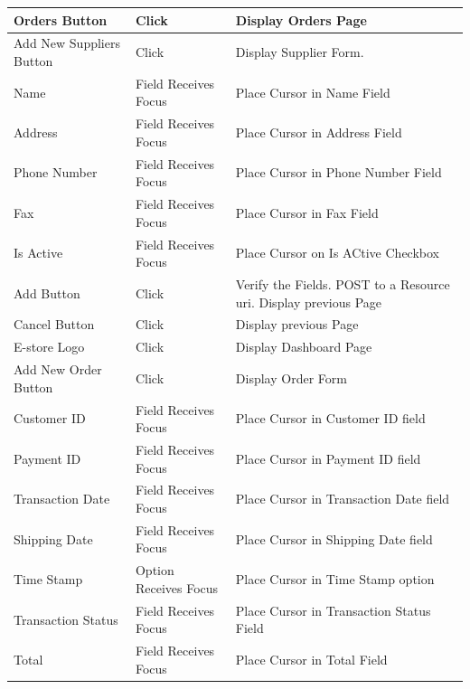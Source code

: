 \documentclass{report}
\begin{document}
\begin{center}
	\begin{tabular}{ m{1.5in} | m{1.5in} | m{1.5in} }
	Orders Button 		& Click 					& Display Orders Page \\
	\hline
	Add New Suppliers Button & Click 				& Display Supplier Form. \\
	\hline
	Name 				& Field Receives Focus 	& Place Cursor in Name Field \\
	\hline
	Address 				& Field Receives Focus 	& Place Cursor in Address Field \\
	\hline
	Phone Number 		& Field Receives Focus 	& Place Cursor in Phone Number Field \\ 
	\hline
	Fax 					& Field Receives Focus 	& Place Cursor in Fax Field \\
	\hline
	Is Active 			& Field Receives Focus 	& Place Cursor on Is ACtive Checkbox \\
	\hline
	Add Button 			& Click 					& Verify the Fields. POST to a Resource uri. Display previous Page \\
	\hline
	Cancel Button 		& Click 					& Display previous Page \\
	\hline
	E-store Logo 		& Click 					& Display Dashboard Page \\
	\hline 
	Add New Order Button & Click 				& Display Order Form \\ 
	\hline
	Customer ID 			& Field Receives Focus 	& Place Cursor in Customer ID field \\
	\hline
	Payment ID 			& Field Receives Focus 	& Place Cursor in Payment ID field \\
	\hline
	Transaction Date 	& Field Receives Focus 	& Place Cursor in Transaction Date field \\
	\hline
	Shipping Date 		& Field Receives Focus 	& Place Cursor in Shipping Date field \\
	\hline
	Time Stamp 			& Option Receives Focus 	& Place Cursor in Time Stamp option \\
	\hline
	Transaction Status 	& Field Receives Focus 	& Place Cursor in Transaction Status Field \\
	\hline
	Total 				& Field Receives Focus 	& Place Cursor in Total Field \\
	\end{tabular}
	
	\newpage
	

\end{center}
\end{document}
